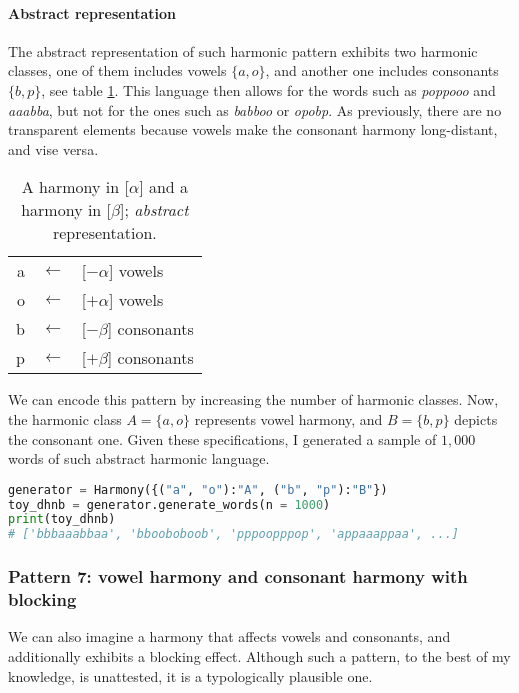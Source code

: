 \paragraph{Abstract representation}

The abstract representation of such harmonic pattern exhibits two harmonic classes, one of them includes vowels $\{a, o\}$, and another one includes consonants $\{b, p\}$, see table \ref{dhnbmap}.
This language then allows for the words such as \emph{poppooo} and \emph{aaabba}, but not for the ones such as \emph{babboo} or \emph{opobp}.
As previously, there are no transparent elements because vowels make the consonant harmony long-distant, and vise versa.

\begin{table}[h!]
\begin{center}
\begin{tabular}{rcl}
a & $\leftarrow$ & {[}$-\alpha${]} vowels \\
o & $\leftarrow$ & {[}$+\alpha${]} vowels \\
b & $\leftarrow$ & {[}$-\beta${]} consonants \\
p & $\leftarrow$ & {[}$+\beta${]} consonants
\end{tabular}
\end{center}
\caption{A harmony in {[}$\alpha${]} and a harmony in {[}$\beta${]}; \emph{abstract} representation.}
\label{dhnbmap}
\end{table}

We can encode this pattern by increasing the number of harmonic classes.
Now, the harmonic class $A = \{a, o\}$ represents vowel harmony, and $B = \{b, p\}$ depicts the consonant one.
Given these specifications, I generated a sample of $1,000$ words of such abstract harmonic language.


\begin{lstlisting}[language=Python]
generator = Harmony({("a", "o"):"A", ("b", "p"):"B"})
toy_dhnb = generator.generate_words(n = 1000)
print(toy_dhnb)
# ['bbbaaabbaa', 'bbooboboob', 'pppoopppop', 'appaaappaa', ...]
\end{lstlisting}


\subsubsection{Pattern 7: vowel harmony and consonant harmony with blocking}

We can also imagine a harmony that affects vowels and consonants, and additionally exhibits a blocking effect.
Although such a pattern, to the best of my knowledge, is unattested, it is a typologically plausible one.


